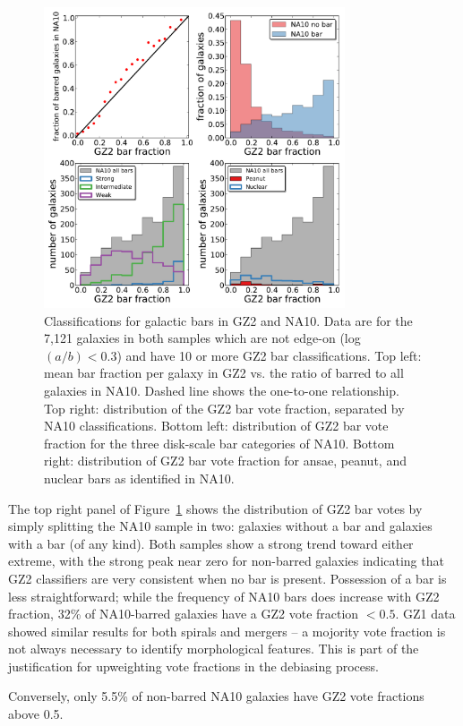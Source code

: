 \documentclass[useAMS,usenatbib]{mn2e}
\begin{document}
\begin{figure}
\includegraphics[angle=0,width=3.5in]{figures/na_gz2_bars.pdf}
\caption{Classifications for galactic bars in GZ2 and NA10. Data are for the 7,121 galaxies in both samples which are not edge-on (log~$(a/b)<0.3$) and have 10 or more GZ2 bar classifications. Top left: mean bar fraction per galaxy in GZ2 vs. the ratio of barred to all galaxies in NA10. Dashed line shows the one-to-one relationship. Top right: distribution of the GZ2 bar vote fraction, separated by NA10 classifications. Bottom left: distribution of GZ2 bar vote fraction for the three disk-scale bar categories of NA10. Bottom right: distribution of GZ2 bar vote fraction for ansae, peanut, and nuclear bars as identified in NA10. 
\label{fig-na_bars}}
\end{figure}

The top right panel of Figure~\ref{fig-na_bars} shows the distribution of GZ2 bar votes by simply splitting the NA10 sample in two: galaxies without a bar and galaxies with a bar (of any kind). Both samples show a strong trend toward either extreme, with the strong peak near zero for non-barred galaxies indicating that GZ2 classifiers are very consistent when no bar is present. Possession of a bar is less straightforward; while the frequency of NA10 bars does increase with GZ2 fraction, 32\% of NA10-barred galaxies have a GZ2 vote fraction $<0.5$. GZ1 data showed similar results for both spirals \citep{bam09} and mergers \citep{dar10a} -- a mojority vote fraction is not always necessary to identify morphological features. This is part of the justification for upweighting vote fractions in the debiasing process.  

Conversely, only 5.5\% of non-barred NA10 galaxies have GZ2 vote fractions above 0.5. %
\end{document}
